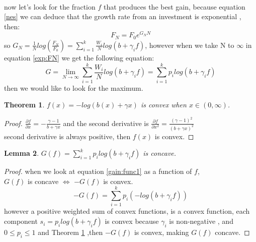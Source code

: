 \documentclass{article}
\newtheorem{thm}{Theorem}[section]
\newtheorem{lem}[thm]{Lemma}
\newcommand{\pdiv}[2]{{\frac{\partial#1}{\partial#2}}}
\begin{document}
	\\
	now let's look for the fraction \(f\) that produces the best gain, because equation \ref{nes} we can deduce that the growth rate from an investment is exponential , then:
	\begin{equation}
		\label{exp:FN}
		F_N = F_0e^{G_{N}N}
	\end{equation}
	so \(G_N = \frac{1}{N}log(\frac{F_N}{F_0}) = \sum_{i=1}^{k} \frac{W_i}{N}log(b + \gamma_i f)\), however when we take N to \(\infty\) in equation \ref{exp:FN} we get the following equation:
	\begin{equation}
		\label{gain:func1}
		G = \lim_{N \to \infty} \sum_{i=1}^{k} \frac{W_i}{N}log(b+\gamma_i f) = \sum_{i=1}^{k} p_i log(b+\gamma_i f)
	\end{equation}
	then we would like to look for the maximum.
	\newline \newline
	\begin{thm}\label{thm1}
		$f(x) = -log(b(x)+\gamma x)$ is convex when $x\in (0,\infty)$.
	\end{thm}
	\begin{proof}
		$\pdiv{f}{x} = -\frac{\gamma - 1}{b+\gamma x}$ and the second derivative is 
		$\frac{\partial f}{\partial x^2} = \frac{(\gamma -1) ^2}{(b+\gamma x)^2}$\\
		second derivative is always positive, then $f(x)$ is convex.
		\newline
	\end{proof}
	
	\begin{lem}
		\(G(f) = \sum_{i=1}^{k} p_i log(b+\gamma_i f)\) is concave.
	\end{lem}
	\begin{proof}
		when we look at equation \ref{gain:func1} as a function of $f$,\\
		$G(f)$ is concave $\iff$ $-G(f)$ is convex.
		\[-G(f) = \sum_{i=1}^{k} p_i (-log(b+\gamma_i f))\]
		however a positive weighted sum of convex functions, is a convex function, each component $s_i = p_i log(b+\gamma_i f)$ is convex because $\gamma _i$ is non-negative , and $0\le p_i \le 1$ and Theorem \ref{thm1} ,then \(-G(f)\) is convex, making $G(f)$ concave.
		\newline
	\end{proof}
\end{document}
